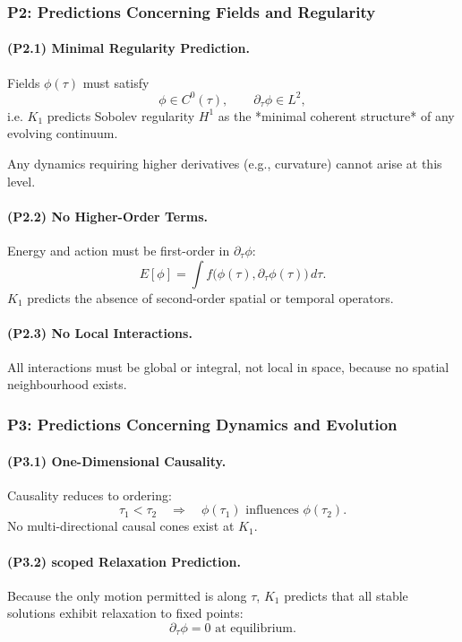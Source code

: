 \subsubsection{P2: Predictions Concerning Fields and Regularity}

\paragraph{(P2.1) Minimal Regularity Prediction.}
Fields $\phi(\tau)$ must satisfy
\[
\phi \in C^0(\tau), \qquad \partial_\tau \phi \in L^2,
\]
i.e. $K_1$ predicts Sobolev regularity $H^1$ as the *minimal coherent
structure* of any evolving continuum.

Any dynamics requiring higher derivatives (e.g., curvature) cannot arise at
this level.

\paragraph{(P2.2) No Higher-Order Terms.}
Energy and action must be first-order in $\partial_\tau\phi$:
\[
E[\phi] = \int f\big(\phi(\tau), \partial_\tau\phi(\tau)\big)\, d\tau.
\]
$K_1$ predicts the absence of second-order spatial or temporal operators.

\paragraph{(P2.3) No Local Interactions.}
All interactions must be global or integral, not local in space, because no
spatial neighbourhood exists.

\subsubsection{P3: Predictions Concerning Dynamics and Evolution}

\paragraph{(P3.1) One-Dimensional Causality.}
Causality reduces to ordering:
\[
\tau_1 < \tau_2 \quad \Rightarrow \quad \phi(\tau_1) \text{ influences } \phi(\tau_2).
\]
No multi-directional causal cones exist at $K_1$.

\paragraph{(P3.2) scoped Relaxation Prediction.}
Because the only motion permitted is along $\tau$, $K_1$ predicts that
all stable solutions exhibit relaxation to fixed points:
\[
\partial_\tau \phi = 0 \text{ at equilibrium}.
\]

